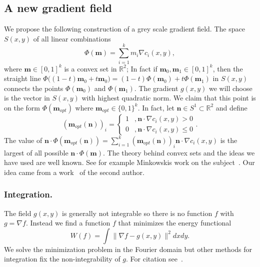 \documentclass[conference]{IEEEtran}
\begin{document}
\subsection{A new gradient field}
We propose the following construction of a grey scale gradient field.
%
The space $S(x,y)$ of all linear combinations
$$\Phi(\mathbf{m})=\sum_{i=1}^{k}m_i\nabla c_i(x,y),$$ where $\mathbf{m}\in[0,1]^k$ is a convex set in $\mathbb{R}^2$;
In fact if $\mathbf{m}_0,\mathbf{m}_1\in[0,1]^k$, then the straight line $\Phi\big((1-t)\mathbf{m}_0+t\mathbf{m}_0\big)=(1-t)\Phi(\mathbf{m}_0)+t\Phi(\mathbf{m}_1)$ in $S(x,y)$ connects the points $\Phi(\mathbf{m}_0)$ and $\Phi(\mathbf{m}_1)$.
%
The gradient $g(x,y)$ we will choose is the vector in $S(x,y)$ with highest quadratic norm.
%
We claim that this point is on the form $\Phi(\mathbf{m}_{opt})$ where $\mathbf{m}_{opt}\in\{0,1\}^k$.
%
In fact, let $\mathbf{n}\in S^1\subset\mathbb{R}^2$ and define $$(\mathbf{m}_{opt}(\mathbf{n}))_i=\begin{cases}1&,\mathbf{n}\cdot\nabla c_i(x,y)>0\\0&,\mathbf{n}\cdot\nabla c_i(x,y)\leq0\end{cases}.$$
%
The value of $\mathbf{n}\cdot \Phi(\mathbf{m}_{opt}(\mathbf{n}))=\sum_{i=1}^k(\mathbf{m}_{opt}(\mathbf{n}))_i\mathbf{n}\cdot\nabla c_i(x,y)$ is the largest of all possible $\mathbf{n}\cdot \Phi(\mathbf{m})$.
%
The theory behind convex sets and the ideas we have used are well known. See for example Minkowskis work on the subject~\cite{Minkowski:03}.
%
Our idea came from a work~\cite{Mackiewicz:19} of the second author.
%
\subsubsection{Integration.}
The field $g(x,y)$ is generally not integrable so there is no function $f$ with $g=\nabla f$.
%
Instead we find a function $f$ that minimizes the energy functional
$$W(f)=\int \|\nabla f-g(x,y)\|^2dxdy.$$
We solve the minimization problem in the Fourier domain but other methods for integration fix the non-integrability of $g$. For citation see~\cite{Chellappa:05}.
\end{document}
